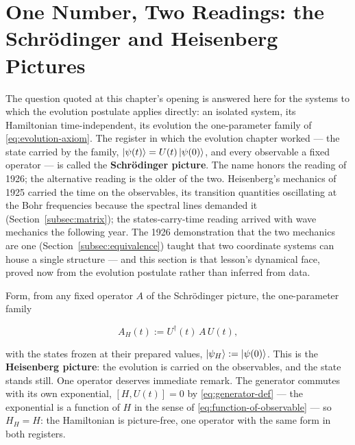 \section{One Number, Two Readings: the Schr\"odinger and Heisenberg Pictures}
\label{sec:schroedinger-heisenberg-pictures}

The question quoted at this chapter's opening is answered here for the systems to which the evolution postulate applies directly: an isolated system, its Hamiltonian time-independent, its evolution the one-parameter family of \eqref{eq:evolution-axiom}. The register in which the evolution chapter worked --- the state carried by the family, $\ket{\psi(t)} = U(t)\ket{\psi(0)}$, and every observable a fixed operator --- is called the \textbf{Schr\"odinger picture}. The name honors the reading of 1926; the alternative reading is the older of the two. Heisenberg's mechanics of 1925 carried the time on the observables, its transition quantities oscillating at the Bohr frequencies because the spectral lines demanded it (Section~\ref{subsec:matrix}); the states-carry-time reading arrived with wave mechanics the following year. The 1926 demonstration that the two mechanics are one (Section~\ref{subsec:equivalence}) taught that two coordinate systems can house a single structure --- and this section is that lesson's dynamical face, proved now from the evolution postulate rather than inferred from data.

Form, from any fixed operator $A$ of the Schr\"odinger picture, the one-parameter family
\begin{linenomath}
    \begin{equation}
        A_H(t) := U^\dagger(t)\,A\,U(t),
        \label{eq:heisenberg-operator}
    \end{equation}
\end{linenomath}
with the states frozen at their prepared values, $\ket{\psi_H} := \ket{\psi(0)}$. This is the \textbf{Heisenberg picture}: the evolution is carried on the observables, and the state stands still. One operator deserves immediate remark. The generator commutes with its own exponential, $[H, U(t)] = 0$ by \eqref{eq:generator-def} --- the exponential is a function of $H$ in the sense of \eqref{eq:function-of-observable} --- so $H_H = H$: the Hamiltonian is picture-free, one operator with the same form in both registers.

